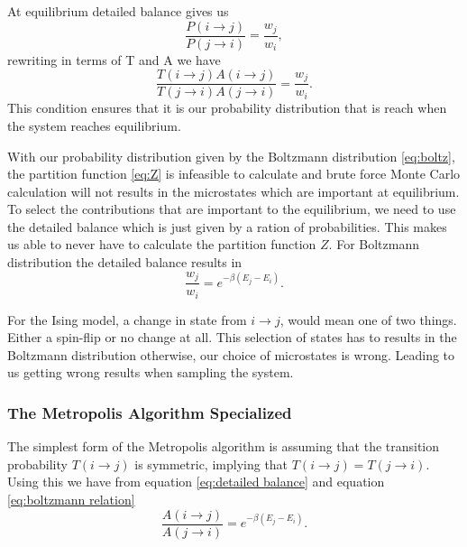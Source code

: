 \documentclass[%
reprint,
nofootinbib,
amsmath,amssymb,
aps,
]{revtex4-1}
\begin{document}
At equilibrium detailed balance gives us 
\begin{equation}
	\frac{P(i\rightarrow j)}{P(j\rightarrow i)} = \frac{w_j}{w_i},
\end{equation}
rewriting in terms of T and A we have 
\begin{equation}\label{eq:detailed balance}
	\frac{T(i\rightarrow j)A(i\rightarrow j)}{T(j\rightarrow i)A(j\rightarrow i)} = \frac{w_j}{w_i}.
\end{equation}
This condition ensures that it is our probability distribution that is reach when the system reaches equilibrium\cite{morten}.

With our probability distribution given by the Boltzmann distribution \eqref{eq:boltz}, the partition function \eqref{eq:Z} is infeasible to calculate and brute force Monte Carlo calculation will not results in the microstates which are important at equilibrium. To select the contributions that are important to the equilibrium, we need to use the detailed balance which is just given by a ration of probabilities. This makes us able to never have to calculate the partition function $Z$. 
For Boltzmann distribution the detailed balance results in 
\begin{equation}\label{eq:boltzmann relation}
	\frac{w_j}{w_i} = e^{-\beta \left(E_j - E_i\right)}.
\end{equation}

For the Ising model, a change in state from $i \rightarrow j$, would mean one of two things. Either a spin-flip or no change at all. This selection of states has to results in the Boltzmann distribution otherwise, our choice of microstates is wrong. Leading to us getting wrong results when sampling the system. 

\subsubsection{The Metropolis Algorithm Specialized}%
The simplest form of the Metropolis algorithm is assuming that the transition probability $T(i\rightarrow j)$ is symmetric, implying that $T(i\rightarrow j) = T(j\rightarrow i)$. Using this we have from equation \eqref{eq:detailed balance} and equation \eqref{eq:boltzmann relation}
\begin{equation}
	\frac{A(i\rightarrow j)}{A(j\rightarrow i)} = e^{-\beta \left(E_j - E_i\right)}.
\end{equation}
\end{document}
